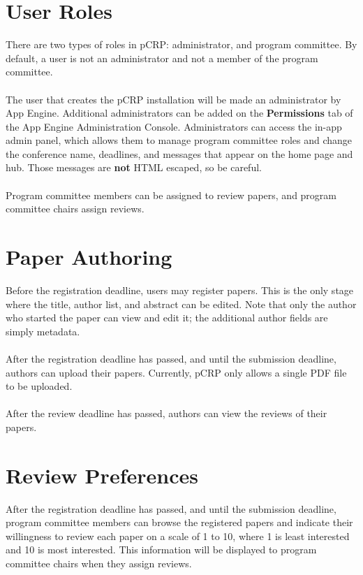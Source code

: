 \documentclass[12pt]{article}
\begin{document}
\section{User Roles}
	There are two types of roles in pCRP: administrator, and program
	committee. By default, a user is not an administrator and not a member
	of the program committee.
	\\\\
	The user that creates the pCRP installation will be made an
	administrator by App Engine. Additional administrators can be added
	on the \textbf{Permissions} tab of the App Engine Administration Console.
	Administrators can access the in-app admin panel, which allows them to
	manage program committee roles and change the conference name, deadlines,
	and messages that appear on the home page and hub. Those messages are
	\textbf{not} HTML escaped, so be careful.
	\\\\
	Program committee members can be assigned to review papers, and program
	committee chairs assign reviews.

\section{Paper Authoring}
	Before the registration deadline, users may register papers. This is the
	only stage where the title, author list, and abstract can be edited. Note
	that only the author who started the paper can view and edit it; the
	additional author fields are simply metadata.
	\\\\
	After the registration deadline has passed, and until the submission
	deadline, authors can upload their papers. Currently, pCRP only allows a
	single PDF file to be uploaded.
	\\\\
	After the review deadline has passed, authors can view the reviews of
	their papers.

\section{Review Preferences}
	After the registration deadline has passed, and until the submission
	deadline, program committee members can browse the registered papers
	and indicate their willingness to review each paper on a scale of
	1 to 10, where 1 is least interested and 10 is most interested. This
	information will be displayed to program committee chairs when they
	assign reviews.
\end{document}
